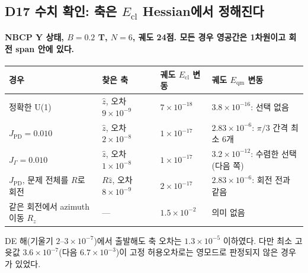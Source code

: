 \subsection{D17 수치 확인: 축은 $E_{\mathrm{cl}}$ Hessian에서 정해진다}\label{state-selection-check}
\begingroup%
  \framesubtitle{NBCP Y 상태, $B=0.2$ T, $N=6$, 궤도 24점. 모든 경우 영공간은 1차원이고 회전 span 안에 있다.}
  \small
  \begin{tabularx}{\textwidth}{@{}YP{2.6cm}P{2.3cm}P{4.2cm}@{}}
    \toprule
    경우 & 찾은 축 & 궤도 $E_{\mathrm{cl}}$ 변동 & 궤도 $E_{\mathrm{qm}}$ 변동 \\
    \midrule
    정확한 U(1) & $\hat z$, 오차 $9\times10^{-9}$ & $7\times10^{-18}$ & $3.8\times10^{-16}$: 선택 없음 \\
    $J_{\mathrm{PD}}=0.010$ & $\hat z$, 오차 $2\times10^{-8}$ & $1\times10^{-17}$ & $2.83\times10^{-6}$: $\pi/3$ 간격 최소 6개 \\
    $J_\Gamma=0.010$ & $\hat z$, 오차 $1\times10^{-8}$ & $1\times10^{-17}$ & $3.2\times10^{-12}$: 수렴한 선택(다음 쪽) \\
    $J_{\mathrm{PD}}$, 문제 전체를 $R$로 회전 & $R\hat z$, 오차 $8\times10^{-9}$ & $2\times10^{-17}$ & $2.83\times10^{-6}$: 회전 전과 같음 \\
    같은 회전에서 azimuth 이동 $R_z$ & --- & $1.5\times10^{-2}$ & 의미 없음 \\
    \bottomrule
  \end{tabularx}
  \par\medskip
  DE 해(기울기 $2$--$3\times10^{-7}$)에서 출발해도 축 오차는 $1.3\times10^{-5}$ 이하였다.
  다만 최소 고윳값 $3.6\times10^{-7}$(다음 $6.7\times10^{-3}$)이 고정 허용오차로는 영모드로 판정되지 않은 경우가 있었다.
  \par\medskip
\endgroup


